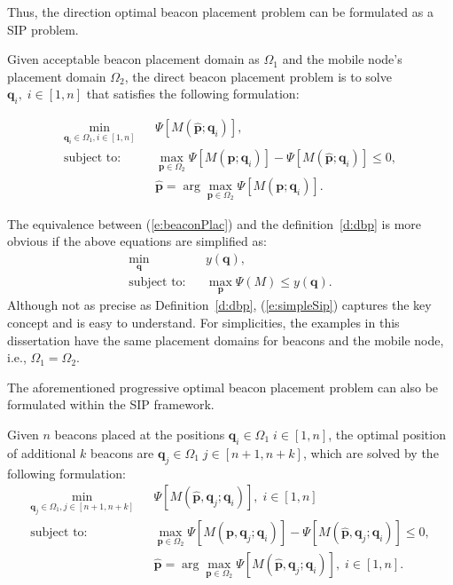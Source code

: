 Thus, the direction optimal beacon placement problem can be formulated as a SIP problem.
\begin{mdef}\label{d:dbp}
Given acceptable beacon placement domain as $\Omega_1$ and the mobile node's placement domain $\Omega_2$, the direct beacon placement problem is to solve $\mathbf{q}_i,\; i\in[1,n]$ that satisfies the following formulation:
\end{mdef}
\begin{eqnarray*}
  \min_{\mathbf{q}_i\in \Omega_1, i\in[1,n]} && \Psi[M(\mathbf{\hat{p}}; \mathbf{q}_i)],\\
  \textrm{subject to:} && \max_{\mathbf{p}\in\Omega_2} \Psi[M(\mathbf{p}; \mathbf{q}_i)]-\Psi[M(\mathbf{\hat{p}}; \mathbf{q}_i)] \leq 0, \\
  && \mathbf{\hat{p}} = \arg\max_{\mathbf{p}\in\Omega_2} \Psi[M(\mathbf{p}; \mathbf{q}_i)].
\end{eqnarray*}
\begin{remark}
The equivalence between (\ref{e:beaconPlac}) and the definition~\ref{d:dbp} is more obvious if the above equations are simplified as:
\begin{eqnarray}
  \min_{\mathbf{q}} && y(\mathbf{q}), \label{e:simpleSip}\\
  \textrm{subject to:} && \max_{\mathbf{p}} \Psi(M)\leq y (\mathbf{q}). \nonumber
\end{eqnarray}
Although not as precise as Definition~\ref{d:dbp}, (\ref{e:simpleSip}) captures the key concept and is easy to understand.
    For simplicities, the examples in this dissertation have the same placement domains for beacons and the mobile node, i.e., $\Omega_1=\Omega_2$.
\end{remark}

The aforementioned progressive optimal beacon placement problem can also be formulated within the SIP framework.
\begin{mdef}
Given $n$ beacons placed at the positions $\mathbf{q}_i\in\Omega_1\; i\in[1,n]$, the optimal position of additional $k$ beacons are $\mathbf{q}_j\in\Omega_1\; j\in[n+1,n+k]$, which are solved by the following formulation:
\begin{eqnarray*}
  \min_{\mathbf{q}_j\in \Omega_1, j\in[n+1,n+k]} && \Psi[M(\mathbf{\hat{p}}, \mathbf{q}_j;\mathbf{q}_i)],\; i\in[1,n]\\
  \textrm{subject to:} && \max_{\mathbf{p}\in\Omega_2} \Psi[M(\mathbf{p}, \mathbf{q}_j;\mathbf{q}_i)]-\Psi[M(\mathbf{\hat{p}}, \mathbf{q}_j;\mathbf{q}_i)] \leq 0,  \\
  && \mathbf{\hat{p}} = \arg\max_{\mathbf{p}\in\Omega_2} \Psi[M(\mathbf{\hat{p}}, \mathbf{q}_j;\mathbf{q}_i)],\; i\in[1,n] .
\end{eqnarray*}
\end{mdef}


